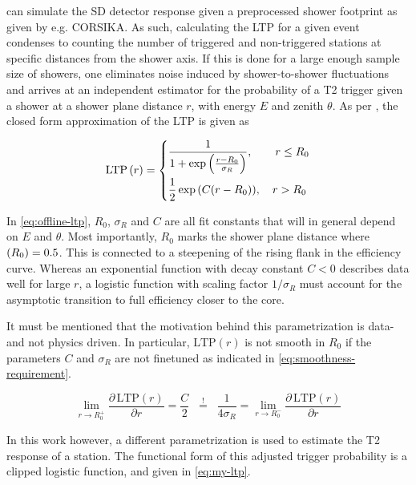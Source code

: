 \Offline can simulate the SD detector response given a preprocessed shower footprint as given by e.g. CORSIKA. As such, calculating the LTP for a given event
condenses to counting the number of triggered and non-triggered stations at specific distances from the shower axis. If this is done for a large enough sample size
of showers, one eliminates noise induced by shower-to-shower fluctuations and arrives at an independent estimator for the probability of a T2 trigger given a 
shower at a shower plane distance $r$, with energy $E$ and zenith $\theta$. As per \cite{abreu2011lateral}, the closed form approximation of the LTP is given as

\begin{equation}
	\label{eq:offline-ltp}
	\text{LTP}\left(r\right) = 
	\begin{dcases}
		\frac{1}{1 + \exp\left(\frac{r - R_0}{\sigma_R}\right)}, \qquad r \leq R_0 \\
		\frac{1}{2} \exp{\left(C(r-R_0)\right)},\;\;\;\,r > R_0
	\end{dcases}
\end{equation}

In \autoref{eq:offline-ltp}, $R_0$, $\sigma_R$ and $C$ are all fit constants that will in general depend on $E$ and $\theta$. Most importantly, $R_0$ marks the 
shower plane distance where $\text(R_0) = 0.5$. This is connected to a steepening of the rising flank in the efficiency curve. Whereas an exponential function with
decay constant $C<0$ describes data well for large $r$, a logistic function with scaling factor $1/\sigma_R$ must account for the asymptotic transition to full 
efficiency closer to the core.

It must be mentioned that the motivation behind this parametrization is data- and not physics driven. In particular, $\text{LTP}(r)$ is not smooth in $R_0$ if the 
parameters $C$ and $\sigma_R$ are not finetuned as indicated in \autoref{eq:smoothness-requirement}.

\begin{equation}
	\label{eq:smoothness-requirement}
	\lim\limits_{r \to R_0^+} \frac{\partial\,\text{LTP}(r)}{\partial r} = \frac{C}{2} \;\; \stackrel{!}{=} \;\; \frac{1}{4\sigma_R} = \lim\limits_{r \to R_0^-} \frac{\partial\,\text{LTP}(r)}{\partial r}
\end{equation}

In this work however, a different parametrization is used to estimate the T2 response of a station. The functional form of this adjusted trigger probability is
a clipped logistic function, and given in \autoref{eq:my-ltp}.


